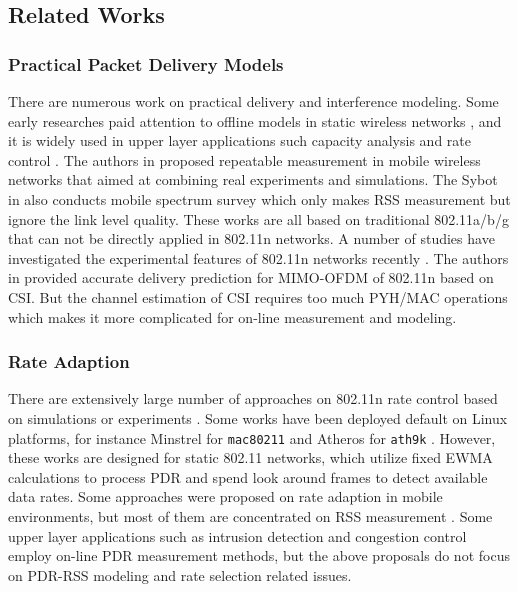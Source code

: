 \documentclass[draftclsnofoot,journal,onecolumn,11pt]{IEEEtran}
\begin{document}
\subsection{Related Works}
\subsubsection{Practical Packet Delivery Models}
There are numerous work on practical delivery and interference modeling. Some early researches paid attention to offline models in static wireless networks \cite{kolar2011mesh} \cite{reis2006model}, and it is widely used in upper layer applications such capacity analysis \cite{kashyap2007capacity} and rate control \cite{chen2011ram} \cite{judd2008efficient}. The authors in \cite{10.1109/TMC.2009.87} proposed repeatable measurement in mobile wireless networks that aimed at combining real experiments and simulations. The Sybot in \cite{kim2010sybot} also conducts mobile spectrum survey which only makes RSS measurement but ignore the link level quality. These works are all based on traditional 802.11a/b/g that can not be directly applied in 802.11n networks. A number of studies have investigated the experimental features of 802.11n networks recently \cite{Halperin2010predictable} \cite{k.rayanchu:fluid:}. The authors in \cite{Halperin2010predictable} provided accurate delivery prediction for MIMO-OFDM of 802.11n based on CSI. But the channel estimation of CSI \cite{CSI-SF} requires too much PYH/MAC operations which makes it more complicated for on-line measurement and modeling.

\subsubsection{Rate Adaption}
There are extensively large number of approaches on 802.11n rate control based on simulations or experiments \cite{kim2009experimental} \cite{Pefkianakis:2010} \cite{zhang2008practical}. Some works have been deployed default on Linux platforms, for instance Minstrel \cite{minstrel} for \texttt{mac80211} and Atheros for \texttt{ath9k} \cite{wong2008wireless}. However, these works are designed for static 802.11 networks, which utilize fixed EWMA calculations to process PDR and spend look around frames to detect available data rates. Some approaches were proposed on rate adaption in mobile environments, but most of them are concentrated on RSS measurement \cite{chen2011ram} \cite{judd2008efficient}. Some upper layer applications such as intrusion detection \cite{5620919} and congestion control \cite{floyd2000equation} employ on-line PDR measurement methods, but the above proposals do not focus on PDR-RSS modeling and rate selection related issues.
\end{document}
